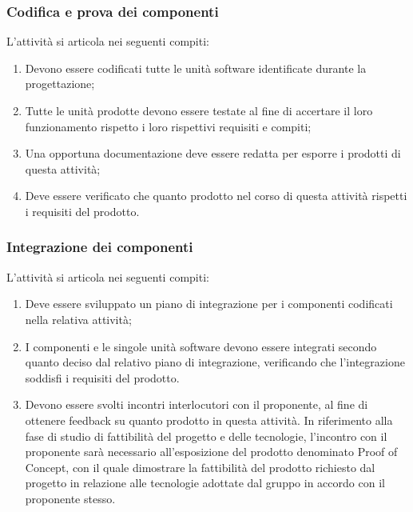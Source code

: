\subsubsection{Codifica e prova dei componenti}
L'attività si articola nei seguenti compiti:
\begin{enumerate}
    \item Devono essere codificati tutte le unità software identificate durante la progettazione;
    \item Tutte le unità prodotte devono essere testate al fine di accertare il loro funzionamento rispetto i loro rispettivi requisiti e compiti;
    \item Una opportuna documentazione deve essere redatta per esporre i prodotti di questa attività;
    \item Deve essere verificato che quanto prodotto nel corso di questa attività rispetti i requisiti del prodotto.
\end{enumerate}

\subsubsection{Integrazione dei componenti}
L'attività si articola nei seguenti compiti:
\begin{enumerate}
    \item Deve essere sviluppato un piano di integrazione per i componenti codificati nella relativa attività;
    \item I componenti e le singole unità software devono essere integrati secondo quanto deciso dal relativo piano di integrazione, verificando che l'integrazione soddisfi i requisiti del prodotto.
    \item Devono essere svolti incontri interlocutori con il proponente, al fine di ottenere feedback su quanto prodotto in questa attività. In riferimento alla fase di studio di fattibilità del progetto e delle tecnologie, l'incontro con il proponente sarà necessario all'esposizione del prodotto denominato Proof of Concept, con il quale dimostrare la fattibilità del prodotto richiesto dal progetto in relazione alle tecnologie adottate dal gruppo in accordo con il proponente stesso.
\end{enumerate}


